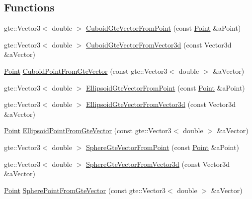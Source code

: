 \subsection*{Functions}
\begin{DoxyCompactItemize}
\item 
gte\+::\+Vector3$<$ double $>$ \hyperlink{namespaceostk_1_1math_1_1geom_1_1d3_1_1objects_af3f0b94aa18ba526935f5bf6abe6a7f0}{Cuboid\+Gte\+Vector\+From\+Point} (const \hyperlink{classostk_1_1math_1_1geom_1_1d3_1_1objects_1_1_point}{Point} \&a\+Point)
\item 
gte\+::\+Vector3$<$ double $>$ \hyperlink{namespaceostk_1_1math_1_1geom_1_1d3_1_1objects_ae8963a3f24065e3d3dc203eee21ea30a}{Cuboid\+Gte\+Vector\+From\+Vector3d} (const Vector3d \&a\+Vector)
\item 
\hyperlink{classostk_1_1math_1_1geom_1_1d3_1_1objects_1_1_point}{Point} \hyperlink{namespaceostk_1_1math_1_1geom_1_1d3_1_1objects_a1c389ebd859f427f97fedccb03d41cbb}{Cuboid\+Point\+From\+Gte\+Vector} (const gte\+::\+Vector3$<$ double $>$ \&a\+Vector)
\item 
gte\+::\+Vector3$<$ double $>$ \hyperlink{namespaceostk_1_1math_1_1geom_1_1d3_1_1objects_a22a1f8043bef37b2f367019b676464de}{Ellipsoid\+Gte\+Vector\+From\+Point} (const \hyperlink{classostk_1_1math_1_1geom_1_1d3_1_1objects_1_1_point}{Point} \&a\+Point)
\item 
gte\+::\+Vector3$<$ double $>$ \hyperlink{namespaceostk_1_1math_1_1geom_1_1d3_1_1objects_a30cbde4545131a3ca01ab7b621653995}{Ellipsoid\+Gte\+Vector\+From\+Vector3d} (const Vector3d \&a\+Vector)
\item 
\hyperlink{classostk_1_1math_1_1geom_1_1d3_1_1objects_1_1_point}{Point} \hyperlink{namespaceostk_1_1math_1_1geom_1_1d3_1_1objects_a3ac3dc557eaa5a2f0d74ee1e483f7785}{Ellipsoid\+Point\+From\+Gte\+Vector} (const gte\+::\+Vector3$<$ double $>$ \&a\+Vector)
\item 
gte\+::\+Vector3$<$ double $>$ \hyperlink{namespaceostk_1_1math_1_1geom_1_1d3_1_1objects_ab5e5801a03f5bdf9e4bb1fd4ef912e1a}{Sphere\+Gte\+Vector\+From\+Point} (const \hyperlink{classostk_1_1math_1_1geom_1_1d3_1_1objects_1_1_point}{Point} \&a\+Point)
\item 
gte\+::\+Vector3$<$ double $>$ \hyperlink{namespaceostk_1_1math_1_1geom_1_1d3_1_1objects_a994fd988c1cb50ee37d241e56be9829c}{Sphere\+Gte\+Vector\+From\+Vector3d} (const Vector3d \&a\+Vector)
\item 
\hyperlink{classostk_1_1math_1_1geom_1_1d3_1_1objects_1_1_point}{Point} \hyperlink{namespaceostk_1_1math_1_1geom_1_1d3_1_1objects_a0305d0045730dca82b7129534cedbf8e}{Sphere\+Point\+From\+Gte\+Vector} (const gte\+::\+Vector3$<$ double $>$ \&a\+Vector)
\end{DoxyCompactItemize}


